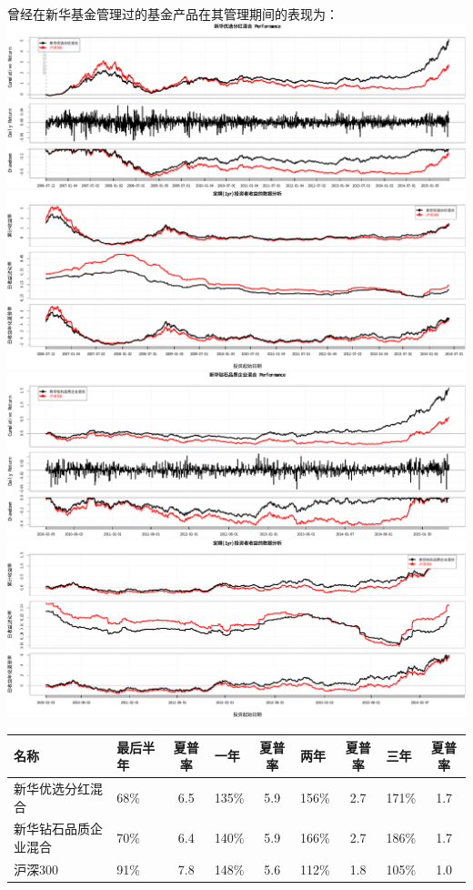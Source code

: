 \documentclass[hyperref,]{ctexart}
\begin{document}
曾经在新华基金管理过的基金产品在其管理期间的表现为：
\includegraphics{caominchang-details_files/figure-latex/unnamed-chunk-3-1.pdf}
\includegraphics{caominchang-details_files/figure-latex/unnamed-chunk-3-2.pdf}
\includegraphics{caominchang-details_files/figure-latex/unnamed-chunk-3-3.pdf}
\includegraphics{caominchang-details_files/figure-latex/unnamed-chunk-3-4.pdf}

\begin{longtable}[]{@{}llclclclc@{}}
\toprule
名称 & 最后半年 & 夏普率 & 一年 & 夏普率 & 两年 & 夏普率 & 三年 &
夏普率\tabularnewline
\midrule
\endhead
新华优选分红混合 & 68\% & 6.5 & 135\% & 5.9 & 156\% & 2.7 & 171\% &
1.7\tabularnewline
新华钻石品质企业混合 & 70\% & 6.4 & 140\% & 5.9 & 166\% & 2.7 & 186\% &
1.7\tabularnewline
沪深300 & 91\% & 7.8 & 148\% & 5.6 & 112\% & 1.8 & 105\% &
1.0\tabularnewline
\bottomrule
\end{longtable}
\end{document}
